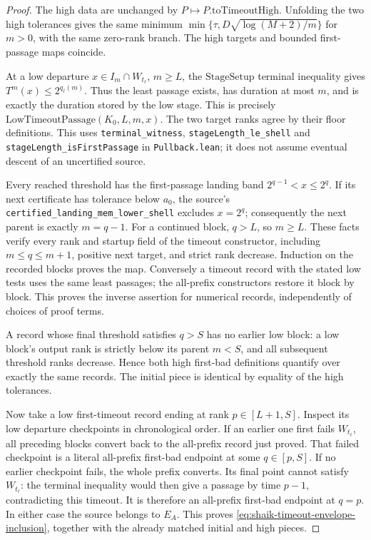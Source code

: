 \documentclass[11pt]{article}
\theoremstyle{remark}\newtheorem{remark}[proposition]{Remark}
\begin{document}
\begin{proof}
The high data are unchanged by \(P\mapsto P.\mathrm{toTimeoutHigh}\).
Unfolding the two high tolerances gives the same minimum
\(\min\{\tau,D\sqrt{\log(M+2)/m}\}\) for \(m>0\), with the same
zero-rank branch. The high targets and bounded first-passage maps coincide.

At a low departure \(x\in I_m\cap W_{t_\ell}\), \(m\ge L\), the
\(\mathrm{StageSetup}\) terminal inequality gives
\(T^m(x)\le2^{q_\ell(m)}\). Thus the least passage exists, has duration
at most \(m\), and is exactly the duration stored by the low stage.
This is precisely \(\mathrm{LowTimeoutPassage}(K_0,L,m,x)\).
The two target ranks agree by their floor definitions. This uses
\texttt{terminal\_witness}, \texttt{stageLength\_le\_shell} and
\texttt{stageLength\_isFirstPassage} in \texttt{Pullback.lean};
it does not assume eventual descent of an uncertified source.

Every reached threshold has the first-passage landing band
\(2^{q-1}<x\le2^q\). If its next certificate has tolerance below \(a_0\),
the source's \texttt{certified\_landing\_mem\_lower\_shell} excludes
\(x=2^q\); consequently the next parent is exactly \(m=q-1\).
For a continued block, \(q>L\), so \(m\ge L\). These facts verify
every rank and startup field of the timeout constructor, including
\(m\le q\le m+1\), positive next target, and strict rank decrease.
Induction on the recorded blocks proves the map. Conversely a timeout
record with the stated low tests uses the same least passages; the
all-prefix constructors restore it block by block. This proves the
inverse assertion for numerical records, independently of choices of
proof terms.

A record whose final threshold satisfies \(q>S\) has no earlier low
block: a low block's output rank is strictly below its parent \(m<S\),
and all subsequent threshold ranks decrease. Hence both high first-bad
definitions quantify over exactly the same records. The initial piece
is identical by equality of the high tolerances.

Now take a low first-timeout record ending at rank \(p\in[L+1,S]\).
Inspect its low departure checkpoints in chronological order.
If an earlier one first fails \(W_{t_\ell}\), all preceding blocks
convert back to the all-prefix record just proved. That failed
checkpoint is a literal all-prefix first-bad endpoint at some
\(q\in[p,S]\). If no earlier checkpoint fails, the whole prefix converts.
Its final point cannot satisfy \(W_{t_\ell}\): the terminal inequality
would then give a passage by time \(p-1\), contradicting this timeout.
It is therefore an all-prefix first-bad endpoint at \(q=p\).
In either case the source belongs to \(E_A\). This proves
\eqref{eq:shaik-timeout-envelope-inclusion}, together with the already
matched initial and high pieces.


\end{proof}
\end{document}
